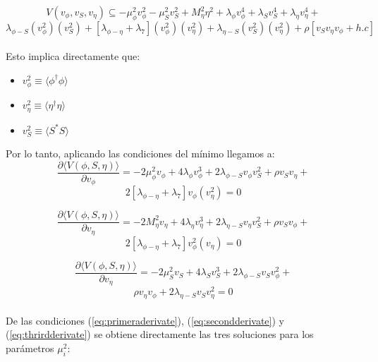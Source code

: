 \documentclass[12pt]{article}
\begin{document}
  \begin{equation}
     \label{eq:PotencialDiracSee2}
          V(v_\phi, v_S, v_\eta) \subseteq  -\mu_\phi^2 v_\phi^2 -  \mu_S^2 v_S^2 + M_\eta^2\eta^2 + \lambda_\phi v_\phi^4+ \lambda_S v_S^4 + \lambda_\eta v_\eta^4 +
    \end{equation}
\[   \lambda_{\phi-S}(v_\phi^2)(v_S ^2)+ [\lambda_{\phi-\eta}+\lambda_7](v_\phi^2)(v_\eta^2)+    \lambda_{\eta-S}(v_S^2 )(v_\eta^2)  + \rho [ v_S v_\eta v_\phi+ h.c]  \] \\


Esto implica directamente que: 

\begin{itemize}
    \item $v^{2}_\phi \equiv \langle \phi^\dagger\phi \rangle$
    \item $v^{2}_\eta \equiv \langle \eta^\dagger\eta \rangle$
    \item $v^{2}_S \equiv \langle S^* S \rangle$

\end{itemize}

Por lo tanto, aplicando las condiciones del mínimo llegamos a: \\

\begin{equation}
\label{eq:primeraderivate}
    \frac{\partial{\langle V(\phi, S, \eta) }\rangle }{\partial v_\phi} =  -2\mu^{2}_\phi v_\phi + 4\lambda_\phi v^{3}_\phi + 2 \lambda_{\phi-S}v_\phi v_S^{2} +  \rho v_S v_\eta +
\end{equation}
 \[ 2[\lambda_{\phi-\eta}+\lambda_7]v_\phi(v_\eta^2)  =0 \] 
 
 
 \begin{equation}
    \frac{\partial{\langle V(\phi, S, \eta) }\rangle }{\partial v_\eta} =  -2M^{2}_\eta v_\eta + 4\lambda_\eta v^{3}_\eta + 2 \lambda_{\eta-S}v_\eta v_S^{2} +  \rho v_S v_\phi +
 \label{eq:secondderivate}
\end{equation}
 \[ 2[\lambda_{\phi-\eta}+\lambda_7]v_\phi^2(v_\eta)  =0 \] 
 
  \begin{equation}
    \frac{\partial{\langle V(\phi, S, \eta) }\rangle }{\partial v_\eta} =  -2\mu^{2}_S v_S + 4\lambda_S v^{3}_S + 2 \lambda_{\phi-S}v_S v_\phi^{2} +
 \label{eq:thrirdderivate}
\end{equation}
 \[   \rho v_\eta v_\phi+2\lambda_{\eta-S}v_S v_\eta^2 = 0\] \\
 
De las condiciones (\ref{eq:primeraderivate}), (\ref{eq:secondderivate}) y (\ref{eq:thrirdderivate}) se obtiene directamente las tres soluciones para los parámetros $ \mu_i^2$: 
\end{document}
